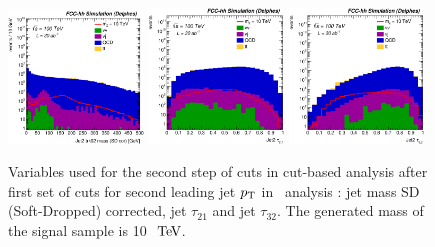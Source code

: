 \begin{figure}[!htb]\centering
\includegraphics[width=0.32\textwidth]{Fig/Zptt/Jet2_trk02_SD_Cor_m_sel1_nostack_log.eps}
\includegraphics[width=0.32\textwidth]{Fig/Zptt/Jet2_tau21_sel1_nostack_log.eps}
\includegraphics[width=0.32\textwidth]{Fig/Zptt/Jet2_tau32_sel1_nostack_log.eps}
\caption{Variables used for the second step of cuts in cut-based analysis after first set of cuts for second leading jet $p\sb{\scriptstyle\mathrm{T}}$ in \Zptt\ analysis : jet mass SD (Soft-Dropped) corrected, jet $\tau_{21}$ and jet $\tau_{32}$. The generated mass of the signal sample is 10 $\TeV$.}
\label{fig:Zptt_sel1_cut}
\end{figure}

